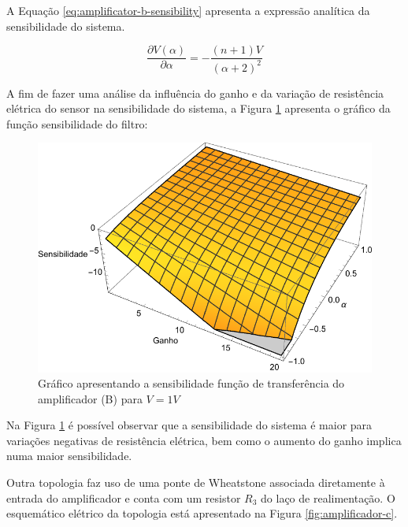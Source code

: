 \documentclass[a4paper]{instrumentacao}
\begin{document}
A Equação \ref{eq:amplificator-b-sensibility} apresenta a expressão analítica da sensibilidade do sistema.

\begin{equation}
	\frac{\partial V(\alpha)}{\partial \alpha} = -\frac{(n+1) V}{(\alpha +2)^2}
	\label{eq:amplificator-b-sensibility}
\end{equation}

A fim de fazer uma análise da influência do ganho e da variação de resistência elétrica do sensor na sensibilidade do sistema, a Figura \ref{fig:amplificador-b-sensibilidade} apresenta o gráfico da função sensibilidade do filtro:

\begin{figure}[H]
\center
\includegraphics[width=\textwidth]{Amplificador-B-Sensibility.pdf}
\caption{Gráfico apresentando a sensibilidade função de transferência do amplificador (B) para $V=1V$}
\label{fig:amplificador-b-sensibilidade}
\end{figure}

Na Figura \ref{fig:amplificador-b-sensibilidade} é possível observar que a sensibilidade do sistema é maior para variações negativas de resistência elétrica, bem como o aumento do ganho implica numa maior sensibilidade.


Outra topologia faz uso de uma ponte de Wheatstone associada diretamente à entrada do amplificador e conta com um resistor $R_3$ do laço de realimentação. O esquemático elétrico da topologia está apresentado na Figura \ref{fig:amplificador-c}.
\end{document}
